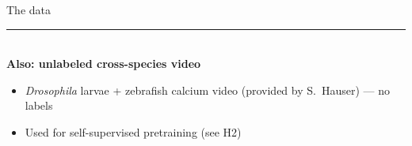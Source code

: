 \begin{frame}[t]{The data}
\vfill
{\color{BaseColor}\rule{\linewidth}{1pt}}\\[0.3em]
{\small\textbf{Also: unlabeled cross-species video}}
{\footnotesize
\begin{itemize}\itemsep=0.2em
\item \textit{Drosophila} larvae + zebrafish calcium video (provided by
      S.~Hauser) --- no labels
\item Used for self-supervised pretraining (see H2)
\end{itemize}}
\end{frame}
